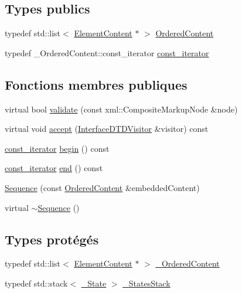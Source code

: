 \subsection*{Types publics}
\begin{DoxyCompactItemize}
\item 
typedef std::list$<$ \hyperlink{classdtd_1_1_element_content}{ElementContent} $\ast$ $>$ \hyperlink{classdtd_1_1_sequence_a0bb035768b3473ac3ba35a2a019ef67a}{OrderedContent}
\item 
typedef \_\-OrderedContent::const\_\-iterator \hyperlink{classdtd_1_1_sequence_a497ef84646eebfccfb0b47ca526dd5cd}{const\_\-iterator}
\end{DoxyCompactItemize}
\subsection*{Fonctions membres publiques}
\begin{DoxyCompactItemize}
\item 
virtual bool \hyperlink{classdtd_1_1_sequence_a585eecddf1104ba42a15944ee4ff4b19}{validate} (const xml::CompositeMarkupNode \&node)
\item 
virtual void \hyperlink{classdtd_1_1_sequence_aa7ce2af63b36ed8be694d875488b108a}{accept} (\hyperlink{classdtd_1_1_interface_d_t_d_visitor}{InterfaceDTDVisitor} \&visitor) const 
\item 
\hyperlink{classdtd_1_1_sequence_a497ef84646eebfccfb0b47ca526dd5cd}{const\_\-iterator} \hyperlink{classdtd_1_1_sequence_ae8a6613ea98f553fdb265509a83935ed}{begin} () const 
\item 
\hyperlink{classdtd_1_1_sequence_a497ef84646eebfccfb0b47ca526dd5cd}{const\_\-iterator} \hyperlink{classdtd_1_1_sequence_a2419c3cfce9678c6f3e9848681d708b2}{end} () const 
\item 
\hyperlink{classdtd_1_1_sequence_ad6a2ad60f2706ccbdd1b6d1720a14ad5}{Sequence} (const \hyperlink{classdtd_1_1_sequence_a0bb035768b3473ac3ba35a2a019ef67a}{OrderedContent} \&embeddedContent)
\item 
virtual \hyperlink{classdtd_1_1_sequence_a119c90cd0d58c42c58acac2e9fa51c54}{$\sim$Sequence} ()
\end{DoxyCompactItemize}
\subsection*{Types protégés}
\begin{DoxyCompactItemize}
\item 
typedef std::list$<$ \hyperlink{classdtd_1_1_element_content}{ElementContent} $\ast$ $>$ \hyperlink{classdtd_1_1_sequence_ae8f07ee87cfe7be8dd9eb5bf01959d66}{\_\-OrderedContent}
\item 
typedef std::stack$<$ \hyperlink{structdtd_1_1_quantifiable_content_1_1___state}{\_\-State} $>$ \hyperlink{classdtd_1_1_sequence_a779e1658dfabe1973ec9a2524501bc88}{\_\-StatesStack}
\end{DoxyCompactItemize}
